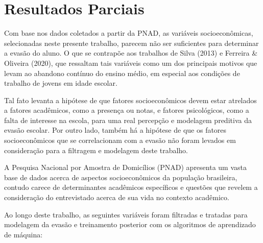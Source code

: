 \documentclass[english, spanish, brazilian]{RBIEarticle} %
\begin{document}
\section{Resultados Parciais}

Com base nos dados coletados a partir da PNAD, as variáveis socioeconômicas, selecionadas neste presente trabalho, parecem não ser suficientes para determinar a evasão do aluno. O que se contrapõe aos trabalhos de Silva (2013) e Ferreira \& Oliveira (2020), que ressaltam tais variáveis como um dos principais motivos que levam ao abandono contínuo do ensino médio, em especial aos condições de trabalho de jovens em idade escolar.

Tal fato levanta a hipótese de que fatores socioeconômicos devem estar atrelados a fatores acadêmicos, como a presença ou notas, e fatores psicológicos, como a falta de interesse na escola, para uma real percepção e modelagem preditiva da evasão escolar. Por outro lado, também há a hipótese de que os fatores socioeconômicos que se correlacionam com a evasão não foram levados em consideração para a filtragem e modelagem deste trabalho.

A Pesquisa Nacional por Amostra de Domicílios (PNAD) apresenta um vasta base de dados acerca de aspectos socioeconômicos da população brasileira, contudo carece de determinantes acadêmicos específicos e questões que revelem a consideração do entrevistado acerca de sua vida no contexto acadêmico. 

Ao longo deste trabalho, as seguintes variáveis foram filtradas e tratadas para modelagem da evasão e treinamento posterior com os algoritmos de aprendizado de máquina:
\end{document}
